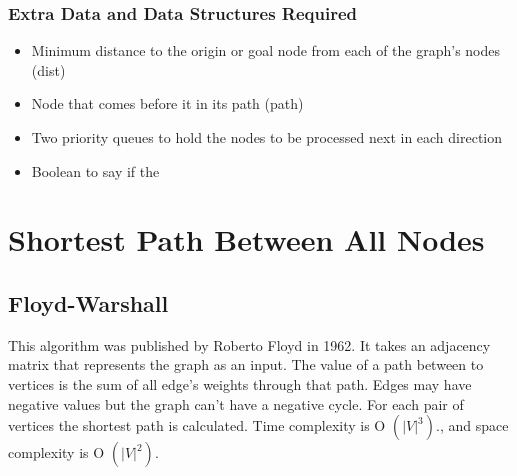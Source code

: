 \subsubsection{Extra Data and Data Structures Required}
\begin{itemize}
    \item Minimum distance to the origin or goal node from each of the graph's nodes (dist)
    \item Node that comes before it in its path (path)
    \item Two priority queues to hold the nodes to be processed next in each direction
    \item Boolean to say if the
\end{itemize}



\section{Shortest Path Between All Nodes}

\subsection{Floyd-Warshall}
This algorithm was published by Roberto Floyd in 1962.
It takes an adjacency matrix that represents the graph as an input. The value of a path between to vertices is the sum of all edge's weights through that path. Edges may have negative values but the graph can't have a negative cycle.
For each pair of vertices the shortest path is calculated. Time complexity is O \begin{math}(|V| ^3).\end{math}, and space complexity is O \begin{math}(|V| ^2).\end{math}



